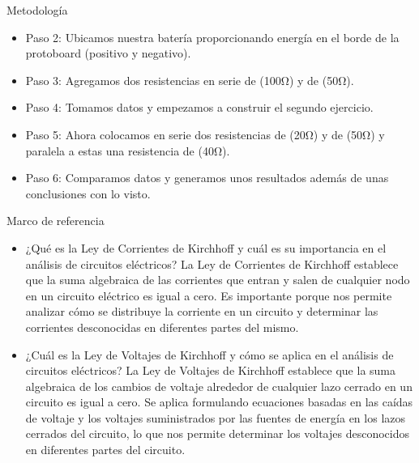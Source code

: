 \documentclass[svgnames, aspectratio=169]{beamer}
\begin{document}
\begin{frame}{Metodología}
\begin{itemize}
        \item Paso 2: Ubicamos nuestra batería proporcionando energía en el borde de la protoboard (positivo y negativo). 
      \item Paso 3: Agregamos dos resistencias en serie de (100Ω) y de (50Ω). 
    \item Paso 4: Tomamos datos y empezamos a construir el segundo ejercicio. 
    \item Paso 5: Ahora colocamos en serie dos resistencias de (20Ω) y de (50Ω) y paralela a estas una resistencia de (40Ω). 
    \item Paso 6: Comparamos datos y generamos unos resultados además de unas conclusiones con lo visto. 
\end{itemize}

\end{frame}

\begin{frame}{Marco de referencia}
\begin{itemize}
    \item ¿Qué es la Ley de Corrientes de Kirchhoff y cuál es su importancia en el análisis de circuitos eléctricos?
    La Ley de Corrientes de Kirchhoff establece que la suma algebraica de las corrientes que entran y salen de cualquier nodo en un circuito eléctrico es igual a cero. Es importante porque nos permite analizar cómo se distribuye la corriente en un circuito y determinar las corrientes desconocidas en diferentes partes del mismo.
    \item ¿Cuál es la Ley de Voltajes de Kirchhoff y cómo se aplica en el análisis de circuitos eléctricos?
    La Ley de Voltajes de Kirchhoff establece que la suma algebraica de los cambios de voltaje alrededor de cualquier lazo cerrado en un circuito es igual a cero. Se aplica formulando ecuaciones basadas en las caídas de voltaje y los voltajes suministrados por las fuentes de energía en los lazos cerrados del circuito, lo que nos permite determinar los voltajes desconocidos en diferentes partes del circuito.
    
\end{itemize}
\end{frame}
\end{document}
